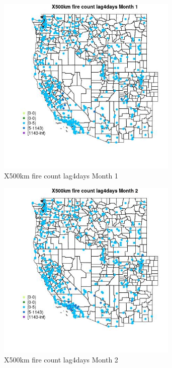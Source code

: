 \begin{figure} 
\centering  
\includegraphics[width=0.77\textwidth]{Code_Outputs/Report_ML_input_PM25_Step4_part_e_de_duplicated_aves_compiled_2019-05-14wNAs_MapObsMo1X500km_fire_count_lag4days.jpg} 
\caption{\label{fig:Report_ML_input_PM25_Step4_part_e_de_duplicated_aves_compiled_2019-05-14wNAsMapObsMo1X500km_fire_count_lag4days}X500km fire count lag4days Month 1} 
\end{figure} 
 

\begin{figure} 
\centering  
\includegraphics[width=0.77\textwidth]{Code_Outputs/Report_ML_input_PM25_Step4_part_e_de_duplicated_aves_compiled_2019-05-14wNAs_MapObsMo2X500km_fire_count_lag4days.jpg} 
\caption{\label{fig:Report_ML_input_PM25_Step4_part_e_de_duplicated_aves_compiled_2019-05-14wNAsMapObsMo2X500km_fire_count_lag4days}X500km fire count lag4days Month 2} 
\end{figure} 
 

